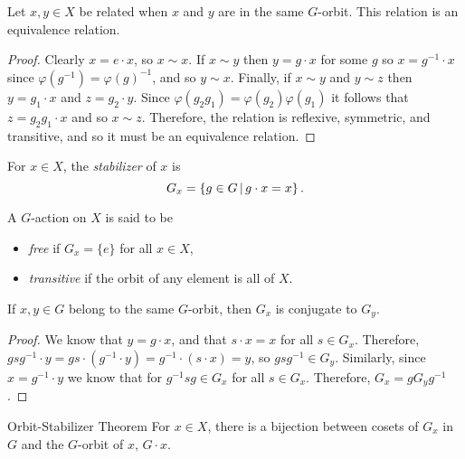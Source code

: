 \begin{prop}
    Let $x, y \in X$ be related when $x$ and $y$ are in the same $G$-orbit. This relation is an equivalence relation.
\end{prop}

\begin{proof}
    Clearly $x = e \cdot x$, so $x \sim x$. If $x \sim y$ then $y = g \cdot x$ for some $g$ so $x = g^{-1} \cdot x$ since $\varphi(g^{-1}) = \varphi(g)^{-1}$, and so $y \sim x$. Finally, if $x \sim y$ and $y \sim z$ then $y = g_1 \cdot x$ and $z = g_2 \cdot y$. Since $\varphi(g_2g_1) = \varphi(g_2)\varphi(g_1)$ it follows that $z = g_2g_1 \cdot x$ and so $x \sim z$. Therefore, the relation is reflexive, symmetric, and transitive, and so it must be an equivalence relation.
\end{proof}

\begin{defn}
    For $x \in X$, the \emph{stabilizer} of $x$ is
    \[G_x = \left\{g \in G \,\middle|\, g \cdot x = x\right\}.\]
\end{defn}

\begin{defn}
    A $G$-action on $X$ is said to be
    \begin{itemize}
        \item \emph{free} if $G_x = \{e\}$ for all $x \in X$,
        \item \emph{transitive} if the orbit of any element is all of $X$.
    \end{itemize}
\end{defn}

\begin{thm}\label{orbit-conjugate-stabilizers}
    If $x, y \in G$ belong to the same $G$-orbit, then $G_x$ is conjugate to $G_y$.
\end{thm}

\begin{proof}
    We know that $y = g \cdot x$, and that $s \cdot x = x$ for all $s \in G_x$. Therefore, $gsg^{-1} \cdot y = gs \cdot (g^{-1} \cdot y) = g^{-1} \cdot (s \cdot x) = y$, so $gsg^{-1} \in G_y$. Similarly, since $x = g^{-1} \cdot y$ we know that for $g^{-1}sg \in G_x$ for all $s \in G_x$. Therefore, $G_x = gG_yg^{-1}$.
\end{proof}

\begin{thm}Orbit-Stabilizer Theorem\label{orbit-stabilizer}\proofbreak
    For $x \in X$, there is a bijection between cosets of $G_x$ in $G$ and the $G$-orbit of $x$, $G \cdot x$.
\end{thm}

